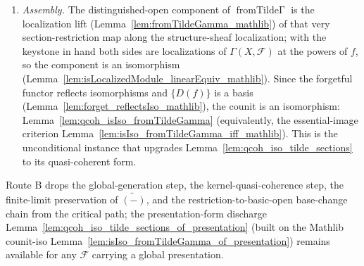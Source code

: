 \begin{remark}
\begin{enumerate}
    localization at the powers of \(f\): Lemma~\ref{lem:qcoh_section_isLocalizedModule}. This is
    proved by the sheaf-axiom equalizer route in degrees \(0/1\). Refine to a finite presentation
    cover \(\{D(g_j)\}\) (Lemma~\ref{lem:qcoh_finite_presentation_cover}); present
    \(\Gamma(X, \mathcal{F})\) and \(\Gamma(D(f), \mathcal{F})\) as the kernels of the {\v C}ech
    differentials on \(\{D(g_j)\}\) and \(\{D(g_j f)\}\) (the degree-\(0/1\) sheaf axiom,
    Lemma~\ref{lem:qcoh_section_equalizer}); localize the global equalizer at \(f\) using exactness of
    localization (Lemma~\ref{lem:localized_module_map_exact_mathlib}); and match it term-by-term with
    the \(D(f)\)-cover equalizer through the per-tile localizations
    (Lemma~\ref{lem:tile_section_localization}), giving the kernel comparison
    (Lemma~\ref{lem:qcoh_section_kernel_comparison}). The route is non-circular because every
    ``sections-localize'' input sits on a presented tile, never on the global object. It is the only
    load-bearing input.
  \item \emph{Assembly.} The distinguished-open component of
    \(\operatorname{fromTilde\Gamma}\) is the localization lift
    (Lemma~\ref{lem:fromTildeGamma_mathlib}) of that very section-restriction map along the
    structure-sheaf localization; with the keystone in hand both sides are localizations of
    \(\Gamma(X, \mathcal{F})\) at the powers of \(f\), so the component is an isomorphism
    (Lemma~\ref{lem:isLocalizedModule_linearEquiv_mathlib}). Since the forgetful functor reflects
    isomorphisms and \(\{D(f)\}\) is a basis (Lemma~\ref{lem:forget_reflectsIso_mathlib}), the counit
    is an isomorphism: Lemma~\ref{lem:qcoh_isIso_fromTildeGamma} (equivalently, the essential-image
    criterion Lemma~\ref{lem:isIso_fromTildeGamma_iff_mathlib}). This is the unconditional instance
    that upgrades Lemma~\ref{lem:qcoh_iso_tilde_sections} to its quasi-coherent form.
  \end{enumerate}
  Route B drops the global-generation step, the kernel-quasi-coherence step, the finite-limit
  preservation of \(\widetilde{(-)}\), and the restriction-to-basic-open base-change chain from the
  critical path; the presentation-form discharge
  Lemma~\ref{lem:qcoh_iso_tilde_sections_of_presentation} (built on the Mathlib counit-iso
  Lemma~\ref{lem:isIso_fromTildeGamma_of_presentation}) remains available for any \(\mathcal{F}\)
  carrying a global presentation.


\end{remark}
